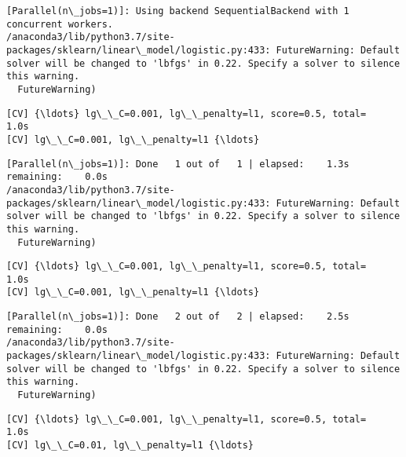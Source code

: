 \documentclass[11pt]{article}
\begin{document}
    \begin{Verbatim}[commandchars=\\\{\}]
[Parallel(n\_jobs=1)]: Using backend SequentialBackend with 1 concurrent workers.
/anaconda3/lib/python3.7/site-packages/sklearn/linear\_model/logistic.py:433: FutureWarning: Default solver will be changed to 'lbfgs' in 0.22. Specify a solver to silence this warning.
  FutureWarning)

    \end{Verbatim}

    \begin{Verbatim}[commandchars=\\\{\}]
[CV] {\ldots} lg\_\_C=0.001, lg\_\_penalty=l1, score=0.5, total=   1.0s
[CV] lg\_\_C=0.001, lg\_\_penalty=l1 {\ldots}

    \end{Verbatim}

    \begin{Verbatim}[commandchars=\\\{\}]
[Parallel(n\_jobs=1)]: Done   1 out of   1 | elapsed:    1.3s remaining:    0.0s
/anaconda3/lib/python3.7/site-packages/sklearn/linear\_model/logistic.py:433: FutureWarning: Default solver will be changed to 'lbfgs' in 0.22. Specify a solver to silence this warning.
  FutureWarning)

    \end{Verbatim}

    \begin{Verbatim}[commandchars=\\\{\}]
[CV] {\ldots} lg\_\_C=0.001, lg\_\_penalty=l1, score=0.5, total=   1.0s
[CV] lg\_\_C=0.001, lg\_\_penalty=l1 {\ldots}

    \end{Verbatim}

    \begin{Verbatim}[commandchars=\\\{\}]
[Parallel(n\_jobs=1)]: Done   2 out of   2 | elapsed:    2.5s remaining:    0.0s
/anaconda3/lib/python3.7/site-packages/sklearn/linear\_model/logistic.py:433: FutureWarning: Default solver will be changed to 'lbfgs' in 0.22. Specify a solver to silence this warning.
  FutureWarning)

    \end{Verbatim}

    \begin{Verbatim}[commandchars=\\\{\}]
[CV] {\ldots} lg\_\_C=0.001, lg\_\_penalty=l1, score=0.5, total=   1.0s
[CV] lg\_\_C=0.01, lg\_\_penalty=l1 {\ldots}

    \end{Verbatim}
\end{document}
